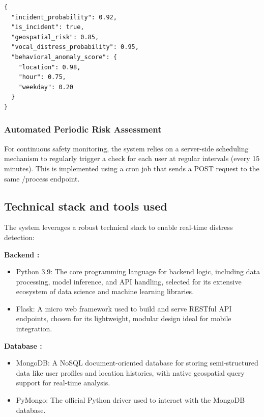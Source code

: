 \documentclass[12pt,a4paper,oneside,english]{book}
\begin{document}
{\begin{lstlisting}[style=jsonstyle-compact]
{
  "incident_probability": 0.92,
  "is_incident": true,
  "geospatial_risk": 0.85,
  "vocal_distress_probability": 0.95,
  "behavioral_anomaly_score": {
    "location": 0.98,
    "hour": 0.75,
    "weekday": 0.20
  }
}
\end{lstlisting}

\subsubsection{Automated Periodic Risk Assessment}
For continuous safety monitoring, the system relies on a server-side scheduling mechanism to regularly trigger a check for each user at regular intervals (every 15 minutes).
This is implemented using a cron job that sends a POST request to the same /process endpoint.

\subsection{Technical stack and tools used}
\label{technical}
The system leverages a robust technical stack to enable real-time distress detection:

\textbf{Backend :}
\begin{itemize}
    \item Python 3.9: The core programming language for backend logic, including data processing, model inference, and API handling, selected for its extensive ecosystem of data science and machine learning libraries.
    \item Flask: A micro web framework used to build and serve RESTful API endpoints, chosen for its lightweight, modular design ideal for mobile integration.
\end{itemize}

\textbf{Database :}
\begin{itemize}
\item MongoDB: A NoSQL document-oriented database for storing semi-structured data like user profiles and location histories, with native geospatial query support for real-time analysis.
\item PyMongo: The official Python driver used to interact with the MongoDB database.
\end{itemize}

}
\end{document}
